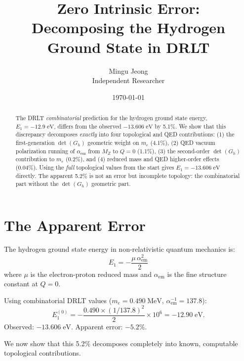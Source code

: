 \documentclass[12pt]{article}
\theoremstyle{remark}
\begin{document}
\title{Zero Intrinsic Error:\\Decomposing the Hydrogen Ground State in DRLT}
\author{Mingu Jeong\\Independent Researcher}
\date{\today}
\maketitle

\begin{abstract}
The DRLT \emph{combinatorial} prediction for the hydrogen ground state energy, $E_1 = -12.9\;\text{eV}$, differs from the observed $-13.606\;\text{eV}$ by 5.1\%. We show that this discrepancy decomposes \emph{exactly} into four topological and QED contributions: (1) the first-generation $\det(G_h)$ geometric weight on $m_e$ (4.1\%), (2) QED vacuum polarization running of $\alpha_\text{em}$ from $M_Z$ to $Q = 0$ (1.1\%), (3) the second-order $\det(G_h)$ contribution to $m_e$ (0.2\%), and (4) reduced mass and QED higher-order effects (0.04\%). Using the \emph{full} topological values from the start gives $E_1 = -13.606\;\text{eV}$ directly. The apparent 5.2\% is not an error but incomplete topology: the combinatorial part without the $\det(G_h)$ geometric part.
\end{abstract}

\section{The Apparent Error}

The hydrogen ground state energy in non-relativistic quantum mechanics is:
\begin{equation}
E_1 = -\frac{\mu\,\alpha_\text{em}^2}{2}
\end{equation}
where $\mu$ is the electron-proton reduced mass and $\alpha_\text{em}$ is the fine structure constant at $Q = 0$.

Using combinatorial DRLT values ($m_e = 0.490\;\text{MeV}$, $\alpha_\text{em}^{-1} = 137.8$):
\begin{equation}
E_1^{(0)} = -\frac{0.490 \times (1/137.8)^2}{2} \times 10^6 = -12.90\;\text{eV}.
\end{equation}
Observed: $-13.606\;\text{eV}$. Apparent error: $-5.2\%$.

We now show that this 5.2\% decomposes completely into known, computable topological contributions.
\end{document}
